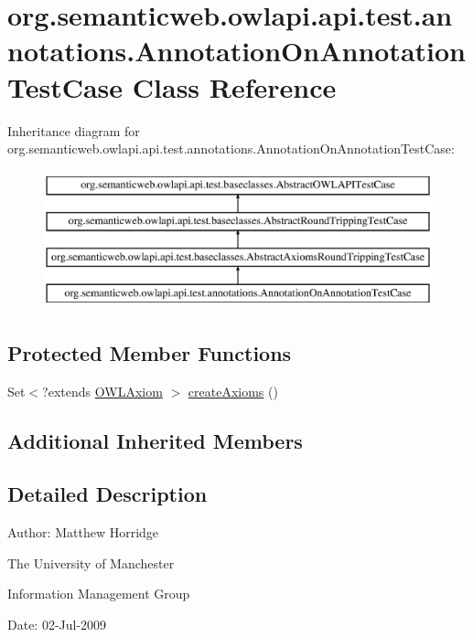 \hypertarget{classorg_1_1semanticweb_1_1owlapi_1_1api_1_1test_1_1annotations_1_1_annotation_on_annotation_test_case}{\section{org.\-semanticweb.\-owlapi.\-api.\-test.\-annotations.\-Annotation\-On\-Annotation\-Test\-Case Class Reference}
\label{classorg_1_1semanticweb_1_1owlapi_1_1api_1_1test_1_1annotations_1_1_annotation_on_annotation_test_case}
}
Inheritance diagram for org.\-semanticweb.\-owlapi.\-api.\-test.\-annotations.\-Annotation\-On\-Annotation\-Test\-Case\-:\begin{figure}[H]
\begin{center}
\leavevmode
\includegraphics[height=4.000000cm]{classorg_1_1semanticweb_1_1owlapi_1_1api_1_1test_1_1annotations_1_1_annotation_on_annotation_test_case}
\end{center}
\end{figure}
\subsection*{Protected Member Functions}
\begin{DoxyCompactItemize}
\item 
Set$<$?extends \hyperlink{interfaceorg_1_1semanticweb_1_1owlapi_1_1model_1_1_o_w_l_axiom}{O\-W\-L\-Axiom} $>$ \hyperlink{classorg_1_1semanticweb_1_1owlapi_1_1api_1_1test_1_1annotations_1_1_annotation_on_annotation_test_case_a016c1f9ae077c8eee14c4b77a2388ced}{create\-Axioms} ()
\end{DoxyCompactItemize}
\subsection*{Additional Inherited Members}


\subsection{Detailed Description}
Author\-: Matthew Horridge\par
 The University of Manchester\par
 Information Management Group\par
 Date\-: 02-\/\-Jul-\/2009 


